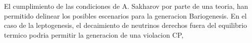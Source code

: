 El cumplimiento de las condiciones de A. Sakharov por parte de una teoria, han permitido delinear los posibles escenarios para la generacion Bariogenesis. En el caso de la leptogenesis, el decaimiento de neutrinos derechos fuera del equilibrio termico podria permitir la generacion de una violacion CP, 